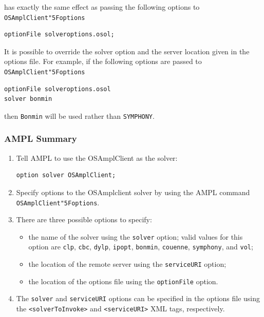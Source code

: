 \documentclass[11pt]{article}
\renewcommand{\_}{{\char"5F}}
\renewcommand{\{}{{\char"7B}}
\renewcommand{\}}{{\char"7D}}
\renewcommand{\^}{{\char"0D}}
\renewcommand{\'}{{\char"0D}}
\begin{document}
\begin{enumerate}[Step 1:]
\noindent has exactly the same effect as passing the following options to  {\tt OSAmplClient\_options}

\begin{verbatim}
optionFile solveroptions.osol;
\end{verbatim}
It is possible to override the solver option and the server location given in the options file. 
For example,  if the following options are passed to {\tt OSAmplClient\_options}
\begin{verbatim}
optionFile solveroptions.osol 
solver bonmin
\end{verbatim}
then  {\tt Bonmin} will be used  
rather than {\tt SYMPHONY}. 


\vskip 12pt

\subsubsection{AMPL Summary}

\begin{enumerate}
\item Tell  AMPL to use the OSAmplClient as the solver:

\begin{verbatim}
option solver OSAmplClient;
\end{verbatim}

\item Specify options to the OSAmplclient solver by using the AMPL command {\tt OSAmplClient\_options}.

\item There are three possible options to specify:

\begin{itemize}

\item the name of the solver using the  {\tt solver} option; valid values for this option  are {\tt clp}, 
{\tt cbc},  {\tt dylp},  {\tt ipopt}, {\tt bonmin},   {\tt couenne},  {\tt symphony}, and {\tt vol};


\item the location of the remote server using   the {\tt serviceURI} option;

\item the location of the options file using  the {\tt optionFile} option.

\end{itemize}

\item The {\tt solver} and {\tt serviceURI} options can be specified in the options file using the 
{\tt <solverToInvoke>} and {\tt <serviceURI>}  XML tags, respectively. 



\end{enumerate}
\end{enumerate}
\end{document}

